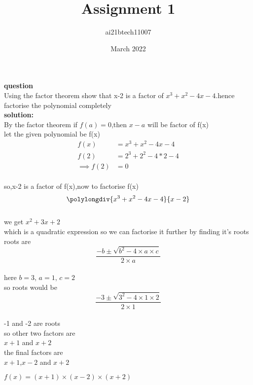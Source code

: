 \documentclass[12pt,two column]{article}
\title{Assignment 1}
\author{ai21btech11007 }
\date{March 2022}
\begin{document}
\maketitle
\textbf{question}\\
Using the factor theorem show that x-2 is a factor of $x^3+x^2-4x-4$.hence factorise the polynomial completely
\\

\textbf{solution: }\\
By the factor theorem if $f(a)=0$,then $x-a$ will be factor of f(x)
\\let the given polynomial be f(x)
\begin{align}
  f(x) &= x^3+x^2-4x-4\\  
  f(2) &= 2^3+2^2-4*2-4\\
\implies
f(2) &= 0
\end{align}
   \\so,x-2 is a factor of f(x),now to factorise f(x) 
  \[
    \polylongdiv{x^3+x^2-4x-4}{x-2}
  \]
  \\we get $x^2+3x+2$
  \\which is a quadratic expression so we can factorise it further by finding it's roots
  \\roots are 
  \[ \frac{-b \pm \sqrt{b^2-4\times a\times c}}{2\times a} \]
  \\here { $b= 3$,
           $a=1$,
           $c=2$ }
 \\so roots would be
   \[ \frac{-3 \pm \sqrt{3^2-4\times 1\times 2}}{2\times 1} \]
   \\ -1 and -2 are roots
   \\so other two factors are
  \\$x+1$ and $x+2$
  \\the final factors are 
  \\$x+1$,$x-2$ and $x+2$

$f(x)=( x+1)\times( x-2)\times( x+2)$
\end{document}
